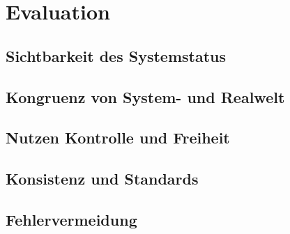 \newpage
\restoregeometry
\section{Evaluation}
\subsection{Sichtbarkeit des Systemstatus}
\subsection{Kongruenz von System- und Realwelt}
\subsection{Nutzen Kontrolle und Freiheit}
\subsection{Konsistenz und Standards}
\subsection{Fehlervermeidung}